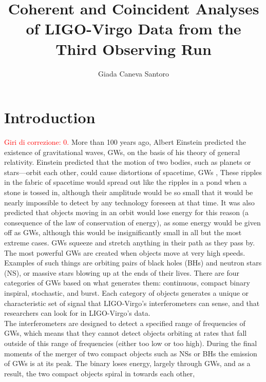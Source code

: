 \documentclass[binding=0.6cm, LaM]{sapthesis}
\title{Coherent and Coincident Analyses of LIGO-Virgo Data from the Third Observing Run}
\author{Giada Caneva Santoro}
\newcommand{\fpg}[1]{\textcolor{red}{#1} }
\begin{document}
\frontmatter
\maketitle
\dedication{Fortsett å gå.}


\tableofcontents

\mainmatter 

\chapter*{Introduction}
%
\fpg{Giri di correzione: 0.}%
	More than 100 years ago, Albert Einstein predicted the existence of gravitational waves,
	GWs, on the basis of his theory of general relativity.  
	Einstein predicted that the motion of two bodies, such as planets or stars—orbit each other,
	could cause distortions of spacetime, GWs \cite{1,2}, 
	These ripples in the fabric of spacetime would spread out like the ripples in a pond when a stone is tossed in,
	although their amplitude would be so small that it would be nearly impossible to detect by any technology foreseen at that time.
	It was also predicted that objects moving in an orbit would lose energy for this reason 
	(a consequence of the law of conservation of energy), as some energy would be given off as GWs, 
	although this would be insignificantly small in all but the most extreme cases. 
	GWs squeeze and stretch anything in their path as they pass by. \\
	The most powerful GWs are created when objects move at very high speeds. 
	Examples of such things are orbiting pairs of black holes (BHs) and neutron stars (NS), 
	or massive stars blowing up at the ends of their lives.
	There are four categories of GWs based on what generates them: 
	continuous, compact binary inspiral, stochastic, and burst. 	
	Each category of objects generates a unique or characteristic set of signal 
	that LIGO-Virgo's interferometers can sense, and that researchers can look for in LIGO-Virgo’s data. \\ 
        The interferometers are designed to detect a specified range of frequencies of GWs,
        which means that they cannot detect objects orbiting at rates that fall outside of this range of frequencies 
        (either too low or too high). 
	During the final moments of the merger of two compact objects such as NSs 
	or BHs the emission of GWs is at its peak. The binary loses energy, 
	largely through GWs, and as a result, the two compact objects spiral in towards each other, 
\end{document}
